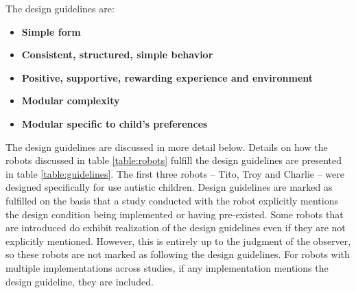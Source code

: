 The design guidelines are:


\begin{itemize}

  \item \textbf{Simple form} \cite{charlie2011, boccanfuso2017low, designSpaces, duquette2008exploring, frith2003autism, giullian2010detailed, robins2007eliciting, robins2006appearance, kozima2009keepon}
  
  \item \textbf{Consistent, structured, simple behavior} \cite{bartneck2004design, charlie2011, boccanfuso2017low, billard2006building, designSpaces, duquette2008exploring, frith2003autism, giullian2010detailed, kim2013social, kim2015potential, kozima2009keepon, robins2007eliciting}
  
  \item \textbf{Positive, supportive, rewarding experience and environment} \cite{ARIA, charlie2011, boccanfuso2017low, carr1983acquisition, giullian2010detailed, huijnen2017implement, kim2015potential, kozima2009keepon, michaud2003characteristics, pop2013social, robins2004effects, robins2007eliciting, wainer2014pilot}
  
  \item \textbf{Modular complexity} \cite{ARIA, billard2006building, bonvillian1981sign, designSpaces, duquette2008exploring, giullian2010detailed, pop2013social, robins2007eliciting, robins2006appearance, tetzchner}
  
  \item \textbf{Modular specific to child's preferences} \cite{designSpaces, bonvillian1981sign, giullian2010detailed, robins2007eliciting, tetzchner}
  
\end{itemize}

The design guidelines are discussed in more detail below. Details on how the robots discussed in table \ref{table:robots} fulfill the design guidelines are presented in table \ref{table:guidelines}. The first three robots – Tito, Troy and Charlie – were designed specifically for use autistic children. Design guidelines are marked as fulfilled on the basis that a study conducted with the robot explicitly mentions the design condition being implemented or having pre-existed. Some robots that are introduced do exhibit realization of the design guidelines even if they are not explicitly mentioned. However, this is entirely up to the judgment of the observer, so these robots are not marked as following the design guidelines. For robots with multiple implementations across studies, if any implementation mentions the design guideline, they are included.


